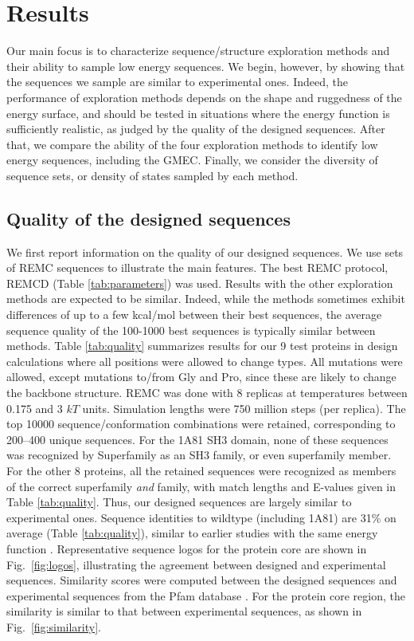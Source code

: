 \documentclass[a4paper,12pt]{article}
\begin{document}
\section{Results}
Our main focus is to characterize sequence/structure exploration methods and their ability to sample low energy
sequences. We begin, however, by showing that the sequences we sample are similar to experimental ones. Indeed,
the performance of exploration methods depends on the shape and ruggedness of the energy surface, and should be
tested in situations where the energy function is sufficiently realistic, as judged by the quality of the designed
sequences. After that, we compare the ability of the four exploration methods to identify low energy sequences,
including the GMEC. Finally, we consider the diversity of sequence sets, or density of states sampled by each method.

\subsection{Quality of the designed sequences}
We first report information on the quality of our designed sequences. We use sets of REMC sequences to illustrate
the main features. The best REMC protocol, REMCD (Table \ref{tab:parameters}) was used. Results with the other
exploration methods are expected to be similar. Indeed, while the methods sometimes exhibit differences of up to a
few kcal/mol between their best sequences, the average sequence quality of the 100-1000 best sequences is typically similar
between methods. Table \ref{tab:quality} summarizes results for our 9 test proteins in design calculations where all
positions were allowed to change types. All mutations were allowed, except mutations to/from Gly and Pro, since these
are likely to change the backbone structure. REMC was done with 8 replicas at temperatures between 0.175 and 3 $kT$
units. Simulation lengths were 750 million steps (per replica). The top 10000 sequence/conformation combinations were
retained, corresponding to 200--400 unique sequences. For the 1A81 SH3 domain, none of these sequences was recognized
by Superfamily as an SH3 family, or even superfamily member.
For the other 8 proteins, all the retained sequences were recognized as members of the correct superfamily {\it and}
family, with match lengths and E-values given in Table \ref{tab:quality}. Thus, our designed sequences are largely
similar to experimental ones. Sequence identities to wildtype (including 1A81) are 31\% on average (Table
\ref{tab:quality}), similar to earlier studies with the same energy function \cite{Schmidt09,Schmidt10}.
Representative sequence logos for the protein core are shown in Fig.\ \ref{fig:logos}, illustrating the agreement
between designed and experimental sequences. Similarity scores were computed between the designed sequences and
experimental sequences from the Pfam database \cite{Pfam}. For the protein core region, the similarity is similar
to that between experimental sequences, as shown in Fig.\ \ref{fig:similarity}.
\end{document}

